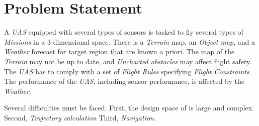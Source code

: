 \cleardoublepage
\chapter{Problem Statement}\label{c:problemStatement}

\noindent A \emph{UAS} equipped with several types of sensors is tasked to fly several types of \emph{Missions} in a 3-dimensional space. There is a \emph{Terrain} map, an \emph{Object map}, and a \emph{Weather} forecast for target region that are  known a priori. The map of the \emph{Terrain} may not be up to date, and \emph{Uncharted obstacles} may affect flight safety. The \emph{UAS} has to comply with a set of \emph{Flight Rules} specifying \emph{Flight Constraints}. The performance of the \emph{UAS}, including sensor performance, is affected by the \emph{Weather}.


Several difficulties must be faced.  First, the design space of is large and complex. Second, \emph{Trajectory calculation} Third, \emph{Navigation}.